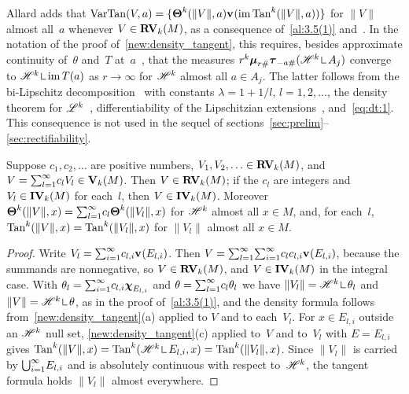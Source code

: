 \begin{remark}
    \label{rem:3.5(1):vartan}
    Allard adds that $\operatorname{VarTan}(V,a) = \{ \boldsymbol{\Theta}^{k}(\|V\|,a) \mathbf{v}_{}(\operatorname{im} \operatorname{Tan}^{k}(\|V\|,a))
    \}$ for $\|V\|$ almost all~$a$ whenever $V \in \mathbf{RV}_{k}(M)$, as a consequence
    of~\ref{al:3.5(1)} and~\cite[2.8.18, 2.9.13]{Federer1969}. In the notation of the proof
    of~\ref{new:density_tangent}, this requires, besides approximate continuity of~$\theta$
    and~$T$ at~$a$~\cite[2.9.13]{Federer1969}, that the measures $r^{\vdim} \scale{r \#} \trans{-a
    \#} (\HM^{\vdim} \restrict A_j)$ converge to $\HM^{\vdim} \restrict \im T(a)$ as $r \to
    \infty$ for $\mathscr{H}^{k}$ almost all $a \in A_j$. The latter follows from the bi-Lipschitz
    decomposition~\cite[3.2.18]{Federer1969} with constants $\lambda = 1 + 1/l$, $l = 1, 2,
    \ldots$, the density theorem for $\mathscr{L}^{k}$~\cite[2.9.11]{Federer1969}, differentiability
    of the Lipschitzian extensions~\cite[3.1.6]{Federer1969}, and~\eqref{eq:dt:1}. This
    consequence is not used in the sequel of sections~\ref{sec:prelim}--\ref{sec:rectifiability}.
\end{remark}

\begin{theorem}
    \label{al:3.5(2)}
    Suppose $c_1, c_2, \ldots$ are positive numbers, $V_1, V_2, \ldots \in \mathbf{RV}_{k}(M)$, and
    $V = {\textstyle\sum_{l=1}^{\infty}} c_l V_l \in \mathbf{V}_{k}(M)$. Then $V \in \mathbf{RV}_{k}(M)$; if the
    $c_l$ are integers and $V_l \in \mathbf{IV}_{k}(M)$ for each~$l$, then $V \in
    \mathbf{IV}_{k}(M)$. Moreover $\boldsymbol{\Theta}^{k}(\|V\|,x) = {\textstyle\sum_{l=1}^{\infty}} c_l
    \boldsymbol{\Theta}^{k}(\|V_l\|,x)$ for $\mathscr{H}^{k}$ almost all $x \in M$, and, for each~$l$,
    $\operatorname{Tan}^{k}(\|V\|,x) = \operatorname{Tan}^{k}(\|V_l\|,x)$ for $\|V_l\|$ almost all $x \in M$.
\end{theorem}

\begin{proof}
    Write $V_l = {\textstyle\sum_{i=1}^{\infty}} c_{l,i} \mathbf{v}_{}(E_{l,i})$. Then $V =
    {\textstyle\sum_{l=1}^{\infty}} {\textstyle\sum_{i=1}^{\infty}} c_l c_{l,i} \mathbf{v}_{}(E_{l,i})$, because the
    summands are nonnegative, so $V \in \mathbf{RV}_{k}(M)$, and $V \in \mathbf{IV}_{k}(M)$ in the
    integral case. With $\theta_l = {\textstyle\sum_{i=1}^{\infty}} c_{l,i} \boldsymbol{\chi}_{E_{l,i}}$ and $\theta =
    {\textstyle\sum_{l=1}^{\infty}} c_l \theta_l$ we have $\|V_l\| = \HM^{\vdim} \restrict \theta_l$ and
    $\|V\| = \HM^{\vdim} \restrict \theta$, as in the proof of~\ref{al:3.5(1)}, and the density
    formula follows from~\ref{new:density_tangent}(a) applied to $V$ and to each~$V_l$. For $x
    \in E_{l,i}$ outside an $\mathscr{H}^{k}$ null set, \ref{new:density_tangent}(c) applied to~$V$
    and to~$V_l$ with $E = E_{l,i}$ gives $\Tan^{\vdim}(\|V\|,x) = \Tan^{\vdim}(\HM^{\vdim}
    \restrict E_{l,i}, x) = \Tan^{\vdim}(\|V_l\|,x)$. Since $\|V_l\|$ is carried by
    ${{\textstyle \bigcup}}_{i=1}^\infty E_{l,i}$ and is absolutely continuous with respect to~$\mathscr{H}^{k}$, the
    tangent formula holds $\|V_l\|$ almost everywhere.
\end{proof}

